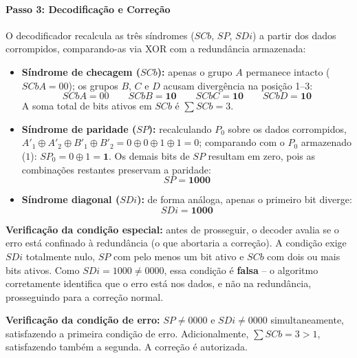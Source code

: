 \documentclass[12pt,a4paper]{article}
\begin{document}
\paragraph{Passo 3: Decodificação e Correção}

O decodificador recalcula as três síndromes ($SCb$, $SP$, $SDi$) a partir 
dos dados corrompidos, comparando-as via XOR com a redundância armazenada:

\begin{itemize}
    \item \textbf{Síndrome de checagem ($SCb$):} apenas o grupo $A$ 
    permanece intacto ($SCbA = 00$); os grupos $B$, $C$ e $D$ acusam 
    divergência na posição 1--3:
    \begin{equation*}
        SCbA = 00 \qquad SCbB = \mathbf{10} \qquad SCbC = \mathbf{10} \qquad SCbD = \mathbf{10}
    \end{equation*}
    A soma total de bits ativos em $SCb$ é $\sum SCb = 3$.
    
    \item \textbf{Síndrome de paridade ($SP$):} recalculando $P_0$ sobre os 
    dados corrompidos, $A'_1 \oplus A'_2 \oplus B'_1 \oplus B'_2 = 0 \oplus 
    0 \oplus 1 \oplus 1 = 0$; comparando com o $P_0$ armazenado ($1$): 
    $SP_0 = 0 \oplus 1 = \mathbf{1}$. Os demais bits de $SP$ resultam em 
    zero, pois as combinações restantes preservam a paridade:
    \begin{equation*}
        SP = \mathbf{1000}
    \end{equation*}
    
    \item \textbf{Síndrome diagonal ($SDi$):} de forma análoga, apenas o 
    primeiro bit diverge:
    \begin{equation*}
        SDi = \mathbf{1000}
    \end{equation*}
\end{itemize}

\textbf{Verificação da condição especial:} antes de prosseguir, o decoder 
avalia se o erro está confinado à redundância (o que abortaria a correção). 
A condição exige $SDi$ totalmente nulo, $SP$ com pelo menos um bit ativo e 
$SCb$ com dois ou mais bits ativos. Como $SDi = 1000 \neq 0000$, essa 
condição é \textbf{falsa} -- o algoritmo corretamente identifica que o erro 
está nos dados, e não na redundância, prosseguindo para a correção normal.

\textbf{Verificação da condição de erro:} $SP \neq 0000$ e $SDi \neq 0000$ 
simultaneamente, satisfazendo a primeira condição de erro. Adicionalmente, 
$\sum SCb = 3 > 1$, satisfazendo também a segunda. A correção é autorizada.
\end{document}
